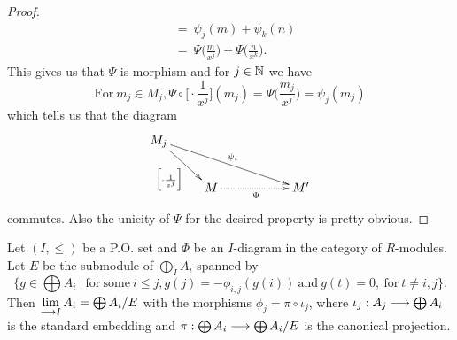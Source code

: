 \documentclass[11pt, a4paper, twoside]{article}
\begin{document}
\begin{proof}
\begin{align*}
                                       &=\ \psi_j(m)+\psi_k(n)\\
                                       &=\ \Psi\bigg(\frac{m}{x^j}\bigg)+\Psi\bigg(\frac{n}{x^k}\bigg).
\end{align*}
This gives us that $\Psi$ is morphism and for $j\in\mathbb{N}$ we have
\begin{displaymath}
    \mathrm{For}\ m_j\in M_j,\Psi\circ\Big[\cdot \frac{1}{x^j}\Big](m_j)=\Psi\bigg(\frac{m_j}{x^j}\bigg)=\psi_j(m_j)
\end{displaymath}
which tells us that the diagram 
\begin{displaymath}
    \xymatrix{
        M_j\ar[dr]_{\Big[\cdot \frac{1}{x^j}\Big]}\ar[drrr]^{\psi_i}\\
        & M\ar@{.>}[rr]_{\Psi}  & & M'
    }
\end{displaymath}
commutes. Also the unicity of $\Psi$ for the desired property is pretty obvious.\newline
\end{proof}
\begin{prop}
Let $(I,\leq)$ be a P.O. set and $\Phi$ be an $I$-diagram in the category of $R$-modules. Let $E$ be the submodule of $\bigoplus_I A_i$ spanned by 
\begin{displaymath}
\{g\in\bigoplus A_i\ |\ \mathrm{for\ some}\ i\leq j ,g(j)=-\phi_{i,j}(g(i))\ \mathrm{and}\ g(t)=0,\ \mathrm{for}\ t\neq i,j\}.    
\end{displaymath}
Then $\lim\limits_{\longrightarrow I}A_i=\bigoplus A_i/E$ with the morphisms $\phi_j=\pi\circ\iota_j$, where $\iota_j:A_j\longrightarrow\bigoplus A_i$ is the standard embedding and $\pi:\bigoplus A_i\longrightarrow\bigoplus A_i/E$ is the canonical projection.
\end{prop}
\end{document}
